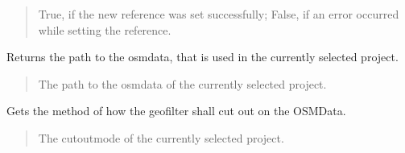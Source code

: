 \documentclass[letterpaper,10pt,english]{sphinxmanual}
\begin{document}
\begin{fulllineitems}
\begin{fulllineitems}
\begin{quote}
\begin{description}
\sphinxAtStartPar
True, if the new reference was set successfully; False, if an error occurred while setting the reference.

\sphinxAtStartPar
{}

\end{description}\end{quote}

\end{fulllineitems}


\begin{fulllineitems}
\label{\detokenize{apidoc/src.osm_configurator.control:src.osm_configurator.control.control.Control.get_osm_data_reference}}
\pysigstartsignatures
{}
\pysigstopsignatures
\sphinxAtStartPar
Returns the path to the osm\sphinxhyphen{}data, that is used in the currently selected project.
\begin{quote}\begin{description}
\sphinxAtStartPar
The path to the osm\sphinxhyphen{}data of the currently selected project.

\sphinxAtStartPar
{}

\end{description}\end{quote}

\end{fulllineitems}


\begin{fulllineitems}
\label{\detokenize{apidoc/src.osm_configurator.control:src.osm_configurator.control.control.Control.get_cut_out_mode}}
\pysigstartsignatures
{}
\pysigstopsignatures
\sphinxAtStartPar
Gets the method of how the geofilter shall cut out on the OSM\sphinxhyphen{}Data.
\begin{quote}\begin{description}
\sphinxAtStartPar
The cut\sphinxhyphen{}out\sphinxhyphen{}mode of the currently selected project.


\end{description}
\end{quote}
\end{fulllineitems}
\end{fulllineitems}
\end{document}
